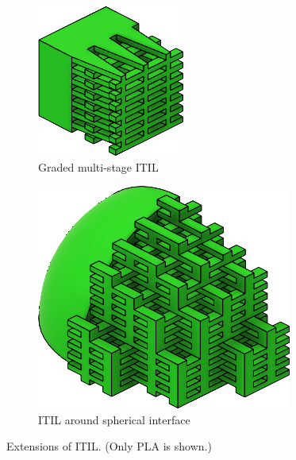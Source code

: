\begin{figure}
	\centering
	\setlength{\figheight}{.35\columnwidth}\centering
	\begin{subfigure}[B]{.45\columnwidth}\centering
		\includegraphics[height=\figheight]{sources-method-graded_lattice__green_only.png}
		\caption{Graded multi-stage ITIL}
		\label{interlocking:fig:graded_lattice}
	\end{subfigure}
	\begin{subfigure}[B]{.5\columnwidth}\centering
		\includegraphics[height=\figheight]{sources-method-complex_interface__green_only.png}
		\caption{ITIL around spherical interface}
		\label{interlocking:fig:complex_interface_lattice}
	\end{subfigure}
	\caption{Extensions of ITIL. (Only PLA is shown.)}
	\label{interlocking:fig:lattice_interface}
\end{figure}



